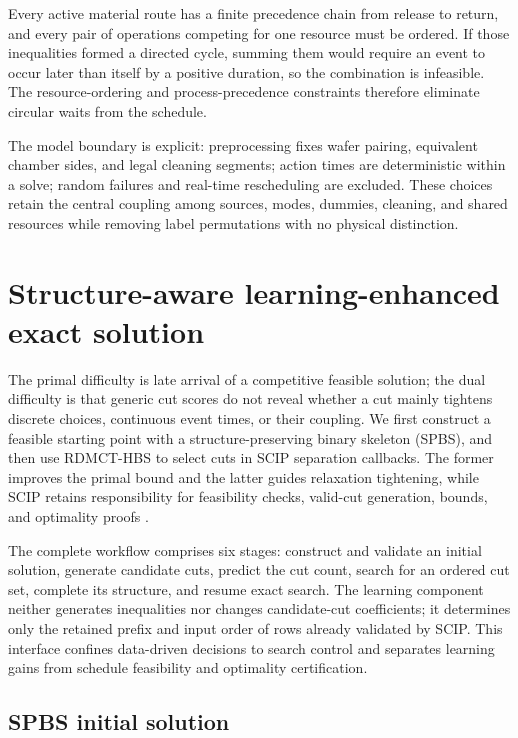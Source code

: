 \documentclass[final,5p,times,twocolumn]{elsarticle}
\newcommand{\method}{RDMCT-HBS}
\begin{document}
Every active material route has a finite precedence chain from release to return, and every pair of operations competing for one resource must be ordered. If those inequalities formed a directed cycle, summing them would require an event to occur later than itself by a positive duration, so the combination is infeasible. The resource-ordering and process-precedence constraints therefore eliminate circular waits from the schedule.

The model boundary is explicit: preprocessing fixes wafer pairing, equivalent chamber sides, and legal cleaning segments; action times are deterministic within a solve; random failures and real-time rescheduling are excluded. These choices retain the central coupling among sources, modes, dummies, cleaning, and shared resources while removing label permutations with no physical distinction.

\section{Structure-aware learning-enhanced exact solution}
\label{sec:method-new}

The primal difficulty is late arrival of a competitive feasible solution; the dual difficulty is that generic cut scores do not reveal whether a cut mainly tightens discrete choices, continuous event times, or their coupling. We first construct a feasible starting point with a structure-preserving binary skeleton (SPBS), and then use \method{} to select cuts in SCIP separation callbacks. The former improves the primal bound and the latter guides relaxation tightening, while SCIP retains responsibility for feasibility checks, valid-cut generation, bounds, and optimality proofs \citep{achterberg2009scip,bestuzheva2023scip}.

The complete workflow comprises six stages: construct and validate an initial solution, generate candidate cuts, predict the cut count, search for an ordered cut set, complete its structure, and resume exact search. The learning component neither generates inequalities nor changes candidate-cut coefficients; it determines only the retained prefix and input order of rows already validated by SCIP. This interface confines data-driven decisions to search control and separates learning gains from schedule feasibility and optimality certification.

\subsection{SPBS initial solution}
\end{document}
